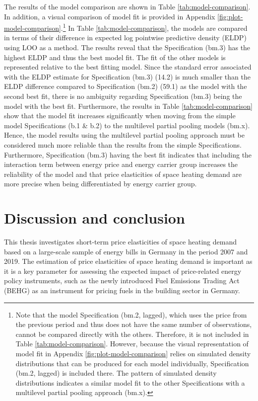 \documentclass[12pt,twoside]{reedthesis}
\begin{document}
The results of the model comparison are shown in Table \ref{tab:model-comparison}. In addition, a visual comparison of model fit is provided in Appendix \ref{fig:plot-model-comparison}.\footnote{Note that the model Specification (bm.2, lagged), which uses the price from the previous period and thus does not have the same number of observations, cannot be compared directly with the others. Therefore, it is not included in Table \ref{tab:model-comparison}. However, because the visual representation of model fit in Appendix \ref{fig:plot-model-comparison} relies on simulated density distributions that can be produced for each model individually, Specification (bm.2, lagged) is included there. The pattern of simulated density distributions indicates a similar model fit to the other Specifications with a multilevel partial pooling approach (bm.x).} In Table \ref{tab:model-comparison}, the models are compared in terms of their difference in expected log pointwise predictive density (ELDP) using LOO as a method. The results reveal that the Specification (bm.3) has the highest ELDP and thus the best model fit. The fit of the other models is represented relative to the best fitting model. Since the standard error associated with the ELDP estimate for Specification (bm.3) (14.2) is much smaller than the ELDP difference compared to Specification (bm.2) (59.1) as the model with the second best fit, there is no ambiguity regarding Specification (bm.3) being the model with the best fit. Furthermore, the results in Table \ref{tab:model-comparison} show that the model fit increases significantly when moving from the simple model Specifications (b.1 \& b.2) to the multilevel partial pooling models (bm.x). Hence, the model results using the multilevel partial pooling approach must be considered much more reliable than the results from the simple Specifications. Furthermore, Specification (bm.3) having the best fit indicates that including the interaction term between energy price and energy carrier group increases the reliability of the model and that price elasticities of space heating demand are more precise when being differentiated by energy carrier group.

\hypertarget{discussion}{%
\chapter{Discussion and conclusion}\label{discussion}}

This thesis investigates short-term price elasticities of space heating demand based on a large-scale sample of energy bills in Germany in the period 2007 and 2019. The estimation of price elasticities of space heating demand is important as it is a key parameter for assessing the expected impact of price-related energy policy instruments, such as the newly introduced Fuel Emissions Trading Act (BEHG) as an instrument for pricing fuels in the building sector in Germany.
\end{document}

